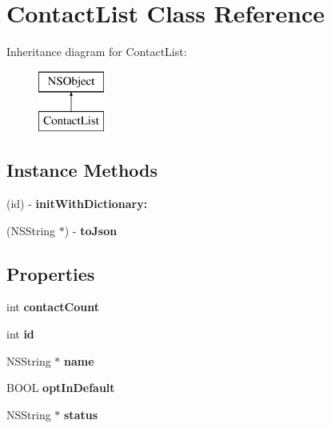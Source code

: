 \hypertarget{interface_contact_list}{\section{Contact\-List Class Reference}
\label{interface_contact_list}
}
Inheritance diagram for Contact\-List\-:\begin{figure}[H]
\begin{center}
\leavevmode
\includegraphics[height=2.000000cm]{interface_contact_list}
\end{center}
\end{figure}
\subsection*{Instance Methods}
\begin{DoxyCompactItemize}
\item 
\hypertarget{interface_contact_list_a2d39e69823679158bf8ea9d360d0ced0}{(id) -\/ {\bfseries init\-With\-Dictionary\-:}}\label{interface_contact_list_a2d39e69823679158bf8ea9d360d0ced0}

\item 
\hypertarget{interface_contact_list_af70b04480731d9a36c88af1455aabfba}{(N\-S\-String $\ast$) -\/ {\bfseries to\-Json}}\label{interface_contact_list_af70b04480731d9a36c88af1455aabfba}

\end{DoxyCompactItemize}
\subsection*{Properties}
\begin{DoxyCompactItemize}
\item 
\hypertarget{interface_contact_list_aa54f2323fcf5e876cee79418cad45215}{int {\bfseries contact\-Count}}\label{interface_contact_list_aa54f2323fcf5e876cee79418cad45215}

\item 
\hypertarget{interface_contact_list_a7fc68eec3b0c15730a69a6fca1ccfeb6}{int {\bfseries id}}\label{interface_contact_list_a7fc68eec3b0c15730a69a6fca1ccfeb6}

\item 
\hypertarget{interface_contact_list_a653eafbd8a3796d3ad72f4b66d521810}{N\-S\-String $\ast$ {\bfseries name}}\label{interface_contact_list_a653eafbd8a3796d3ad72f4b66d521810}

\item 
\hypertarget{interface_contact_list_adf2cac902652c9df6ec173ca2ab332f0}{B\-O\-O\-L {\bfseries opt\-In\-Default}}\label{interface_contact_list_adf2cac902652c9df6ec173ca2ab332f0}

\item 
\hypertarget{interface_contact_list_ae5c6acb5c88634460a5cac1765e68586}{N\-S\-String $\ast$ {\bfseries status}}\label{interface_contact_list_ae5c6acb5c88634460a5cac1765e68586}

\end{DoxyCompactItemize}


